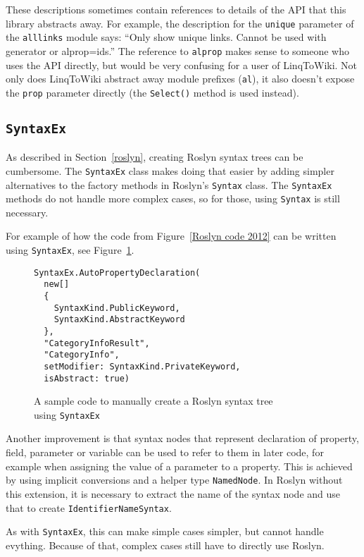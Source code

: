 These descriptions sometimes contain references to details of the API that this library abstracts away.
For example, the description for the \texttt{unique} parameter of the \lstinline{alllinks} module says:
“Only show unique links. Cannot be used with generator or alprop=ids.”
The reference to \texttt{alprop} makes sense to someone who uses the API directly,
but would be very confusing for a user of LinqToWiki.
Not only does LinqToWiki abstract away module prefixes (\texttt{al}),
it also doesn't expose the \texttt{prop} parameter directly
(the \lstinline{Select()} method is used instead).

\subsection{\texorpdfstring{\lstinline{SyntaxEx}}{SyntaxEx}}

As described in Section~\ref{roslyn}, creating Roslyn syntax trees can be cumbersome.
The \lstinline{SyntaxEx} class makes doing that easier by adding simpler alternatives
to the factory methods in Roslyn's \lstinline{Syntax} class.
The \lstinline{SyntaxEx} methods do not handle more complex cases,
so for those, using \lstinline{Syntax} is still necessary.

For example of how the code from Figure~\ref{Roslyn code 2012} can be written using \lstinline{SyntaxEx},
see Figure~\ref{SyntaxEx code}.

\begin{figure}[htbp]

\begin{lstlisting}
SyntaxEx.AutoPropertyDeclaration(
  new[]
  {
    SyntaxKind.PublicKeyword,
    SyntaxKind.AbstractKeyword
  },
  "CategoryInfoResult",
  "CategoryInfo",
  setModifier: SyntaxKind.PrivateKeyword,
  isAbstract: true)
\end{lstlisting}

\caption{A sample code to manually create a Roslyn syntax tree \\ using \lstinline{SyntaxEx}}
\label{SyntaxEx code}
\end{figure}

\medskip

Another improvement is that syntax nodes that represent declaration of property, field, parameter or variable
can be used to refer to them in later code, for example when assigning the value of a parameter to a property.
This is achieved by using implicit conversions and a helper type \lstinline{NamedNode}.
In Roslyn without this extension, it is necessary to extract the name of the syntax node
and use that to create \lstinline{IdentifierNameSyntax}.

As with \lstinline{SyntaxEx}, this can make simple cases simpler, but cannot handle evything.
Because of that, complex cases still have to directly use Roslyn.